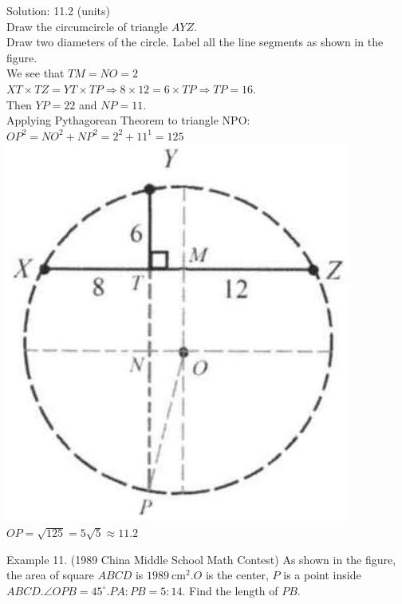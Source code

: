 \documentclass[10pt]{article}
\begin{document}
Solution: 11.2 (units)\\
Draw the circumcircle of triangle \(A Y Z\).\\
Draw two diameters of the circle. Label all the line segments as shown in the figure.\\
We see that \(T M=N O=2\)\\
\(X T \times T Z=Y T \times T P \Rightarrow 8 \times 12=6 \times T P \Rightarrow T P=16\).\\
Then \(Y P=22\) and \(N P=11\).\\
Applying Pythagorean Theorem to triangle NPO:\\
\(O P^{2}=N O^{2}+N P^{2}=2^{2}+11^{1}=125\)\\
\includegraphics[max width=\textwidth]{2025_04_17_97bc1f7e44d93c271a88g-204(3)} \(O P=\sqrt{125}=5 \sqrt{5} \approx 11.2\)

Example 11. (1989 China Middle School Math Contest) As shown in the figure, the area of square \(A B C D\) is \(1989 \mathrm{~cm}^{2} . O\) is the center, \(P\) is a point inside \(A B C D . \angle O P B=45^{\circ} . P A: P B=5: 14\). Find the length of \(P B\).
\end{document}
